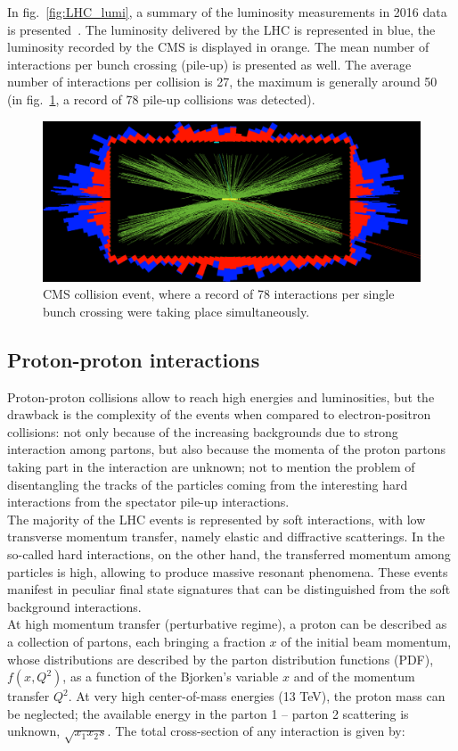 \noindent In fig.~\ref{fig:LHC_lumi}, a summary of the luminosity measurements in 2016 data is presented~\cite{LumiPublicResults}. The luminosity delivered by the LHC is represented in blue, the luminosity recorded by the CMS is displayed in orange. The mean number of interactions per bunch crossing (pile-up) is presented as well. The average number of interactions per collision is 27, the maximum is generally around 50 (in fig.~\ref{fig:pp_pileup}, a record of 78 pile-up collisions was detected).

\begin{figure}[!htb]
  \centering
    \includegraphics[width=.45\textwidth]{figures/78events_PU_b.png}
  \caption{CMS collision event, where a record of 78 interactions per single bunch crossing were taking place simultaneously.~\cite{Holzner:1479324}}
  \label{fig:pp_pileup}
\end{figure}

\subsection{Proton-proton interactions}
\noindent Proton-proton collisions allow to reach high energies and luminosities, but the drawback is the complexity of the events when compared to electron-positron collisions: not only because of the increasing backgrounds due to strong interaction among partons, but also because the momenta of the proton partons taking part in the interaction are unknown; not to mention the problem of disentangling the tracks of the particles coming from the interesting hard interactions from the spectator pile-up interactions.\\
The majority of the LHC events is represented by soft interactions, with low transverse momentum transfer, namely elastic and diffractive scatterings. In the so-called hard interactions, on the other hand, the transferred momentum among particles is high, allowing to produce massive resonant phenomena. These events manifest in peculiar final state signatures that can be distinguished from the soft background interactions.\\
At high momentum transfer (perturbative regime), a proton can be described as a collection of partons, each bringing a fraction $x$ of the initial beam momentum, whose distributions are described by the parton distribution functions (PDF), $f(x,Q^2)$, as a function of the Bjorken's variable $x$ and of the momentum transfer $Q^2$. At very high center-of-mass energies (13 TeV), the proton mass can be neglected; the available energy in the parton 1 -- parton 2 scattering is unknown, $\sqrt{x_1 x_2 s}$. The total cross-section of any interaction is given by:

